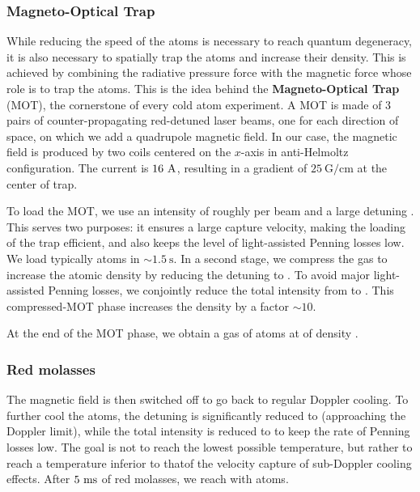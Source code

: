 \subsubsection{Magneto-Optical Trap}

While reducing the speed of the atoms is necessary to reach quantum degeneracy, it is also necessary to spatially trap the atoms and increase their density. This is achieved by combining the radiative pressure force with the magnetic force whose role is to trap the atoms. This is the idea behind the \textbf{Magneto-Optical Trap} (MOT), the cornerstone of every cold atom experiment. A MOT is made of 3 pairs of counter-propagating red-detuned laser beams, one for each direction of space, on which we add a quadrupole magnetic field. In our case, the magnetic field is produced by two coils centered on the $x$-axis in anti-Helmoltz configuration. The current is $16 \ \rm{A}$, resulting in a gradient of $25 \ \mathrm{G/cm}$ at the center of trap.

To load the MOT, we use an intensity of roughly  per beam and a large detuning . This serves two purposes: it ensures a large capture velocity, making the loading of the trap efficient, and also keeps the level of light-assisted Penning losses low. We load typically  atoms in $\sim 1.5 \ \mathrm{s}$. In a second stage, we compress the gas to increase the atomic density by reducing the detuning to . To avoid major light-assisted Penning losses, we conjointly reduce the total intensity from  to . This compressed-MOT phase increases the density by a factor $\sim 10$.

At the end of the MOT phase, we obtain a gas of  atoms at  of density .

\subsubsection{Red molasses}

The magnetic field is then switched off to go back to regular Doppler cooling. To further cool the atoms, the detuning is significantly reduced to  (approaching the Doppler limit), while the total intensity is reduced to  to keep the rate of Penning losses low. The goal is not to reach the lowest possible temperature, but rather to reach a temperature inferior to thatof the velocity capture of sub-Doppler cooling effects. After $5 \ \rm{ms}$ of red molasses, we reach  with  atoms.

